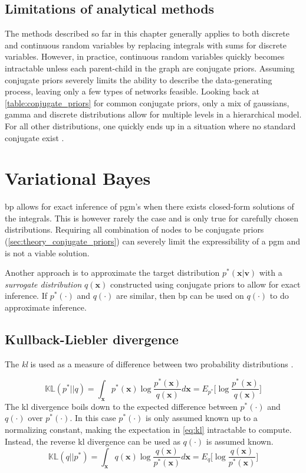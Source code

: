 \subsection{Limitations of analytical methods}
The methods described so far in this chapter generally applies to both discrete and continuous random variables by replacing integrals with sums for discrete variables. However, in practice, continuous random variables quickly becomes intractable unless each parent-child in the graph are conjugate priors. Assuming conjugate priors severely limits the ability to describe the data-generating process, leaving only a few types of networks feasible. Looking back at \cref{table:conjugate_priors} for common conjugate priors, only a mix of gaussians, gamma and discrete distributions allow for multiple levels in a hierarchical model. For all other distributions, one quickly ends up in a situation where no standard conjugate exist \cite{winnbishop}. 
\section{Variational Bayes}
\acrshort{bp} allows for exact inference of \acrshort{pgm}'s when there exists closed-form solutions of the integrals. This is however rarely the case and is only true for carefully chosen distributions. Requiring all combination of nodes to be conjugate priors (\cref{sec:theory_conjugate_priors}) can severely limit the expressibility of a \acrshort{pgm} and is not a viable solution. 

Another approach is to approximate the target distribution $p^*(\mathbf{x} | \mathbf{v})$ with a \textit{surrogate distribution} $q(\mathbf{x})$ constructed using conjugate priors to allow for exact inference. If $p^*(\cdot)$ and $q(\cdot)$ are similar, then \acrshort{bp} can be used on $q(\cdot)$ to do approximate inference.

\subsection{Kullback-Liebler divergence}
The \textit{\acrfull{kl}}  is used as a measure of difference between two probability distributions \cite{kullback1951,murphy}.

\begin{equation}\label{eq:kl}
    \mathbb{KL}(p^* || q) = \int_\mathbf{x} p^*(\mathbf{x}) \log \frac{p^*(\mathbf{x})}{q(\mathbf{x})} d\mathbf{x} = E_{p^*} \big[ \log \frac{p^*(\mathbf{x})}{q(\mathbf{x})} \big]
\end{equation}
The \acrshort{kl} divergence boils down to the expected difference between $p^*(\cdot)$ and $q(\cdot)$ over $p^*(\cdot)$.
In this case $p^*(\cdot)$ is only assumed known up to a normalizing constant, making the expectation in \cref{eq:kl} intractable to compute. Instead, the reverse \acrshort{kl} divergence can be used as $q(\cdot)$ is assumed known.
\begin{equation}\label{eq:reverse_kl}
    \mathbb{KL}(q || p^*) = \int_\mathbf{x} q(\mathbf{x}) \log \frac{q(\mathbf{x})}{p^*(\mathbf{x})} d\mathbf{x} = E_{q} \big[ \log \frac{q(\mathbf{x})}{p^*(\mathbf{x})} \big]
\end{equation}

